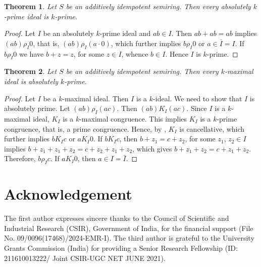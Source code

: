 \documentclass[11pt,english]{amsart}
\newtheorem{theorem}{Theorem}[section]
\theoremstyle{definition}
\numberwithin{equation}{section}
\begin{document}
 \begin{theorem}
     Let $S$ be an additively idempotent semiring. Then every absolutely $k$-prime ideal is $k$-prime.
 \end{theorem}
 
 \begin{proof}
     Let $I$ be an absolutely $k$-prime ideal and $ab\in I$. Then $ab+ab=ab$ implies $(ab)\rho_I0$, that is, $(ab)\rho_I(a\cdot 0)$, which further implies $b\rho_I0$ or $a\in \bar{I}=I$. If $b\rho_I0$ we have $b+z=z$, for some $z\in I$, whence $b\in I$. Hence $I$ is $k$-prime.
 \end{proof}
 
 \begin{theorem}
     Let $S$ be an additively idempotent semiring. Then every $k$-maximal ideal is absolutely $k$-prime.
 \end{theorem}
 
 \begin{proof}
     Let $I$ be a $k$-maximal ideal. Then $I$ is a $k$-ideal. We need to show that $I$ is absolutely prime. Let $(ab)\rho_I(ac)$. Then $(ab)K_I(ac)$. Since $I$ is a $k$-maximal ideal, $K_I$ is a $k$-maximal congruence. This implies $K_I$ is a $k$-prime congruence, that is, a prime congruence. Hence, by \cite[Theorem 2.12]{JooMincheva17}, $K_I$ is cancellative, which further implies $bK_Ic$ or $aK_I0$. If $bK_Ic$, then $b+z_1=c+z_2$, for some $z_1$, $z_2\in I$ implies $b+z_1+z_1+z_2=c+z_2+z_1+z_2$, which gives $b+z_1+z_2=c+z_1+z_2$. Therefore, $b\rho_Ic$. If $aK_I0$, then $a\in I=\bar{I}$. 
 \end{proof}

\section*{Acknowledgement}
The first author expresses sincere thanks to the Council of Scientific and Industrial Research (CSIR), Government of India, for the financial support (File No. 09/0096(17468)/2024-EMR-I). The third author is grateful to the University Grants Commission (India) for providing a Senior Research Fellowship (ID:
211610013222/ Joint CSIR-UGC NET JUNE 2021).
\end{document}

